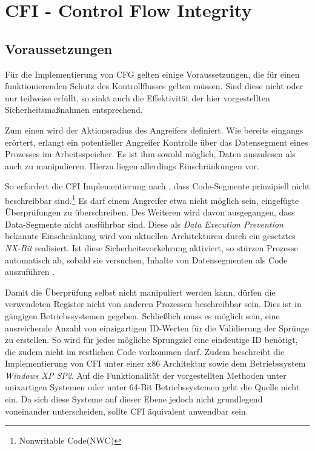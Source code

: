 \section{CFI - Control Flow Integrity}
\subsection{Voraussetzungen}
\label{sec:voraussetzungen}

Für die Implementierung von CFG gelten einige Voraussetzungen, die für einen funktionierenden Schutz des Kontrollflusses gelten müssen. Sind diese nicht oder nur teilweise erfüllt, so sinkt auch die Effektivität der hier vorgestellten Sicherheitsmaßnahmen entsprechend.

Zum einen wird der Aktionsradius des Angreifers definiert. Wie bereits eingangs erörtert, erlangt ein potentieller Angreifer Kontrolle über das Datensegment eines Prozesses im Arbeitsspeicher. Es ist ihm sowohl möglich, Daten auszulesen als auch zu manipulieren. Hierzu liegen allerdings Einschränkungen vor.

So erfordert die CFI Implementierung nach \cite{Abadi.2009}, dass Code-Segmente prinzipiell nicht beschreibbar sind.\footnote{Nonwritable Code(NWC)} Es darf einem Angreifer etwa nicht möglich sein, eingefügte Überprüfungen zu überschreiben. Des Weiteren wird davon ausgegangen, dass Data-Segmente nicht ausführbar sind. Diese als \emph{Data Execution Prevention} bekannte Einschränkung wird von aktuellen Architekturen durch ein gesetztes \emph{NX-Bit} realisiert. Ist diese Sicherheitsvorkehrung aktiviert, so stürzen Prozesse automatisch ab, sobald sie versuchen, Inhalte von Datensegmenten als Code auszuführen \cite{Goktas.}.

Damit die Überprüfung selbst nicht manipuliert werden kann, dürfen die verwendeten Register nicht von anderen Prozessen beschreibbar sein. Dies ist in gängigen Betriebssystemen gegeben.
Schließlich muss es möglich sein, eine ausreichende Anzahl von einzigartigen ID-Werten für die Validierung der Sprünge zu erstellen. So wird für jedes mögliche Sprungziel eine eindeutige ID benötigt, die zudem nicht im restlichen Code vorkommen darf. Zudem beschreibt \cite{Abadi.2009} die Implementierung von CFI unter einer x86 Architektur sowie dem Betriebssystem \emph{Windows XP SP2}. Auf die Funktionalität der vorgestellten Methoden unter unixartigen Systemen oder unter 64-Bit Betriebssystemen geht die Quelle nicht ein. Da sich diese Systeme auf dieser Ebene jedoch nicht grundlegend voneinander unterscheiden, sollte CFI äquivalent anwendbar sein.


